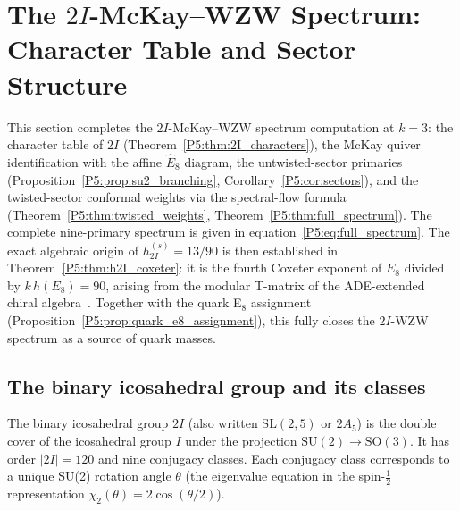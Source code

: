 \documentclass[11pt,a4paper]{article}
\theoremstyle{definition}
\theoremstyle{remark}
\begin{document}
\section{The $2I$-McKay--WZW Spectrum: Character Table and Sector Structure}
\label{P5:sec:2i_spectrum}

This section completes the $2I$-McKay--WZW spectrum computation at $k=3$:
the character table of $2I$ (Theorem~\ref{P5:thm:2I_characters}),
the McKay quiver identification with the affine $\hat{E}_8$ diagram,
the untwisted-sector primaries (Proposition~\ref{P5:prop:su2_branching},
Corollary~\ref{P5:cor:sectors}), and the twisted-sector conformal weights
via the spectral-flow formula (Theorem~\ref{P5:thm:twisted_weights},
Theorem~\ref{P5:thm:full_spectrum}).  The complete nine-primary spectrum
is given in equation~\eqref{P5:eq:full_spectrum}.
The exact algebraic origin of $h_{2I}^{(s)}=13/90$ is then established
in Theorem~\ref{P5:thm:h2I_coxeter}: it is the fourth Coxeter exponent
of $E_8$ divided by $k\,h(E_8)=90$, arising from the modular T-matrix
of the ADE-extended chiral algebra~\cite{CIZ1987}.
Together with the quark E$_8$ assignment (Proposition~\ref{P5:prop:quark_e8_assignment}),
this fully closes the $2I$-WZW spectrum as a source of quark masses.

\subsection{The binary icosahedral group and its classes}

The binary icosahedral group $2I$ (also written $\mathrm{SL}(2,5)$ or
$2A_5$) is the double cover of the icosahedral group $I$ under the
projection $\mathrm{SU}(2)\to\mathrm{SO}(3)$.  It has order $|2I|=120$
and nine conjugacy classes.
Each conjugacy class corresponds to a unique SU(2) rotation angle $\theta$
(the eigenvalue equation in the spin-$\tfrac{1}{2}$ representation
$\chi_2(\theta) = 2\cos(\theta/2)$).
\end{document}
